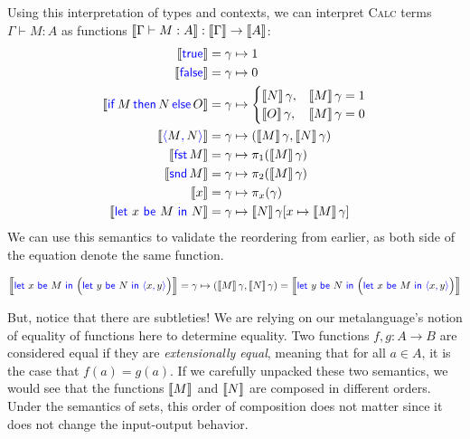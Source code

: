 Using this interpretation of types and contexts, we can interpret \textsc{Calc} terms
\(\Gamma\vdash M : A\)
as functions
$\left\llbracket \Gamma \vdash M : A \right\rrbracket : \left\llbracket \Gamma \right\rrbracket \to \left\llbracket A \right\rrbracket$:
\begin{align*}
  \dbracket{\pltrue{}} &= \gamma \mapsto 1\\
  \dbracket{\plfalse{}} &= \gamma \mapsto 0\\
  \dbracket{\plite{M}{N}{O}} &= \gamma \mapsto \begin{cases}
      \llbr{N} \gamma, & \llbr{M} \gamma = 1 \\
      \llbr{O} \gamma, & \llbr{M} \gamma = 0 \\
    \end{cases}\\
  \dbracket{\plpair{M}{N}} &= \gamma \mapsto (\dbracket{M} \gamma, \dbracket{N} \gamma) \\
  \dbracket{\plfst{M}} &= \gamma \mapsto \pi_1 (\dbracket{M} \gamma) \\
  \dbracket{\plsnd{M}} &= \gamma \mapsto \pi_2 (\dbracket{M} \gamma) \\
  \dbracket{x} &= \gamma \mapsto \pi_x (\gamma) \\
  \dbracket{\pllet{x}{M}{N}} &= \gamma \mapsto \dbracket{N} \gamma[x \mapsto \dbracket{M} \gamma]
\end{align*}
We can use this semantics to validate the reordering from earlier, as
both side of the equation denote the same function.
\begin{fullwidth}
\begin{align*}
  \dbracket{\pllet{x}{M}{\Big( \pllet{y}{N}{\plpair{x}{y}} \Big)}}
  = \gamma \mapsto (\dbracket{M} \gamma, \dbracket{N} \gamma)
  = \dbracket{\pllet{y}{N}{\Big( \pllet{x}{M}{\plpair{x}{y}} \Big)}}
\end{align*}
\end{fullwidth}
But, notice that there are subtleties! We are relying on our metalanguage's
notion of equality of functions here to determine equality. Two functions $f,g :
A \to B$ are considered equal if they are \emph{extensionally equal}, meaning
that for all $a \in A$, it is the case that $f(a) = g(a)$. 
If we carefully unpacked these two semantics, we would see that the functions 
$\left\llbracket M \right\rrbracket$ and $\left\llbracket N \right\rrbracket$ are composed in different orders. 
Under the semantics of sets, this order of composition does not matter since 
it does not change the input-output behavior.

